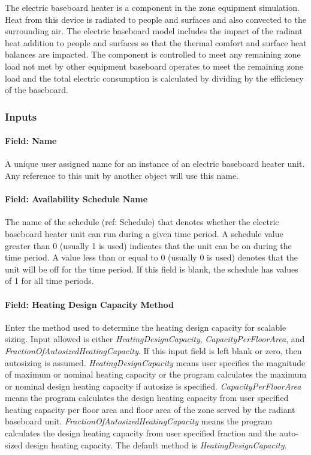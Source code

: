 The electric baseboard heater is a component in the zone equipment simulation. Heat from this device is radiated to people and surfaces and also convected to the surrounding air. The electric baseboard model includes the impact of the radiant heat addition to people and surfaces so that the thermal comfort and surface heat balances are impacted. The component is controlled to meet any remaining zone load not met by other equipment baseboard operates to meet the remaining zone load and the total electric consumption is calculated by dividing by the efficiency of the baseboard.

\subsubsection{Inputs}\label{inputs-2-032}

\paragraph{Field: Name}\label{field-name-2-031}

A unique user assigned name for an instance of an electric baseboard heater unit. Any reference to this unit by another object will use this name.

\paragraph{Field: Availability Schedule Name}\label{field-availability-schedule-name-2-006}

The name of the schedule (ref: Schedule) that denotes whether the electric baseboard heater unit can run during a given time period. A schedule value greater than 0 (usually 1 is used) indicates that the unit can be on during the time period. A value less than or equal to 0 (usually 0 is used) denotes that the unit will be off for the time period. If this field is blank, the schedule has values of 1 for all time periods.

\paragraph{Field: Heating Design Capacity Method}\label{field-heating-design-capacity-method-2}

Enter the method used to determine the heating design capacity for scalable sizing. Input allowed is either \emph{HeatingDesignCapacity}, \emph{CapacityPerFloorArea}, and \emph{FractionOfAutosizedHeatingCapacity}. If this input field is left blank or zero, then autosizing is assumed. \emph{HeatingDesignCapacity} means user specifies the magnitude of maximum or nominal heating capacity or the program calculates the maximum or nominal design heating capacity if autosize is specified. \emph{CapacityPerFloorArea} means the program calculates the design heating capacity from user specified heating capacity per floor area and floor area of the zone served by the radiant baseboard unit. \emph{FractionOfAutosizedHeatingCapacity} means the program calculates the design heating capacity from user specified fraction and the auto-sized design heating capacity. The default method is \emph{HeatingDesignCapacity}.

